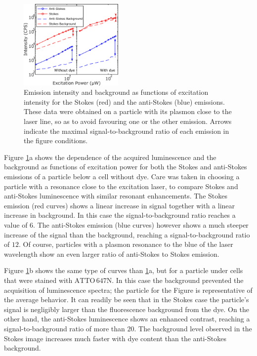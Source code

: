 \documentclass[journal=nalefd,manuscript=letter]{achemso}
\newcommand{\atto}{\ensuremath{\textrm{ATTO}\,647\textrm{N}}}
\begin{document}
\begin{figure}[htp] \centering
\includegraphics[width=0.45\textwidth]{Figures/06_Power_Intensity/power_intensity.png}
\caption{Emission intensity and background as functions of excitation intensity
for the Stokes (red) and the anti-Stokes (blue) emissions. These data were
obtained on a particle with its plasmon close to the laser line, so as to avoid
favouring one or the other emission. Arrows indicate the maximal
signal-to-background ratio of each emission in the figure conditions. }
	\label{fig:power_intensity}
\end{figure}

Figure \ref{fig:power_intensity}a shows the dependence of the acquired
luminescence and the background as functions of excitation power for both the
Stokes and anti-Stokes emissions of a particle below a cell without dye. Care
was taken in choosing a particle with a resonance close to the excitation laser,
to compare Stokes and anti-Stokes luminescence with similar resonant
enhancements. The Stokes emission (red curves) shows a linear increase in signal
together with a linear increase in background. In this case the
signal-to-background ratio reaches a value of $6$. The anti-Stokes emission
(blue curves) however shows a much steeper increase of the signal than the
background, reaching a signal-to-background ratio of $12$. Of course, particles
with a plasmon resonance to the blue of the laser wavelength show an even larger
ratio of anti-Stokes to Stokes emission.

Figure \ref{fig:power_intensity}b shows the same type of curves than
\ref{fig:power_intensity}a, but for a particle under cells that were stained
with \atto. In this case the background prevented the acquisition of
luminescence spectra; the particle for the Figure is representative of the
average behavior. It can readily be seen that in the Stokes case the particle's
signal is negligibly larger than the fluorescence background from the dye. On
the other hand, the anti-Stokes luminescence shows an enhanced contrast,
reaching a signal-to-background ratio of more than $20$. The background level
observed in the Stokes image increases much faster with dye content than the
anti-Stokes background.
\end{document}
